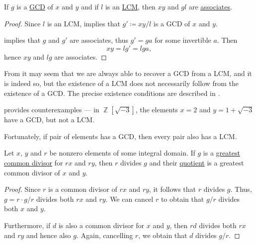 \begin{proposition}\label{thm:gcd_and_lcm}
  If \( g \) is a \hyperref[def:greatest_common_divisor]{GCD} of \( x \) and \( y \) and if \( l \) is an \hyperref[def:least_common_divisor]{LCM}, then \( xy \) and \( gl \) are \hyperref[def:domain_divisibility/associates]{associates}.
\end{proposition}
\begin{proof}
  Since \( l \) is an LCM,  implies that \( g' \coloneqq xy / l \) is a GCD of \( x \) and \( y \).

   implies that \( g \) and \( g' \) are associates, thus \( g' = ga \) for some invertible \( a \). Then
  \begin{equation*}
    xy = lg' = lga,
  \end{equation*}
  hence \( xy \) and \( lg \) are associates.
\end{proof}

\begin{remark}\label{rem:gcd_but_no_lcm}
  From  it may seem that we are always able to recover a GCD from a LCM, and it is indeed so, but the existence of a LCM does not necessarily follow from the existence of a GCD. The precise existence conditions are described in .

   provides counterexamples --- in \( \BbbZ[\sqrt{-3}] \), the elements \( x = 2 \) and \( y = 1 + \sqrt{-3} \) have a GCD, but not a LCM.

  Fortunately, if  pair of elements has a GCD, then every pair also has a LCM.
\end{remark}

\begin{lemma}\label{thm:gcd_of_multiple}
  Let \( x \), \( y \) and \( r \) be nonzero elements of some integral domain. If \( g \) is a \hyperref[def:gcd]{greatest common divisor} for \( rx \) and \( ry \), then \( r \) divides \( g \) and their \hyperref[def:domain_quotient]{quotient} is a greatest common divisor of \( x \) and \( y \).
\end{lemma}
\begin{proof}
  Since \( r \) is a common divisor of \( rx \) and \( ry \), it follows that \( r \) divides \( g \). Thus, \( g = r \cdot g / r \) divides both \( rx \) and \( ry \). We can cancel \( r \) to obtain that \( g / r \) divides both \( x \) and \( y \).

  Furthermore, if \( d \) is also a common divisor for \( x \) and \( y \), then \( rd \) divides both \( rx \) and \( ry \) and hence also \( g \). Again, cancelling \( r \), we obtain that \( d \) divides \( g / r \).
\end{proof}

